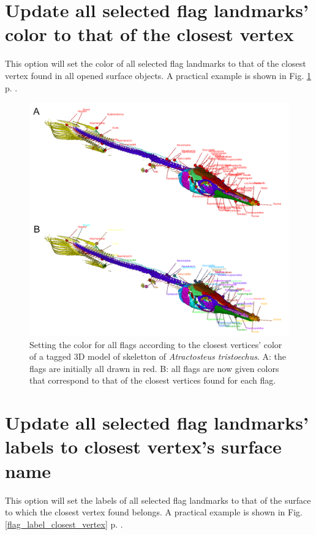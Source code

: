 \section{Update all selected flag landmarks' color to that of the closest vertex}

This option will set the color of all selected flag landmarks to that of the closest vertex found in all opened surface objects. A practical example is shown in Fig. \ref{flag_color_closest_vertex} p. \pageref{flag_color_closest_vertex}.

\begin{figure}
  \centering
  \includegraphics[scale=0.31]{images/10/edit_flag_color_closest_vertex.png} 
	\caption{Setting the color for all flags according to the closest vertices' color of a tagged 3D model of skeletton of \textit{Atractosteus tristoechus}. A: the flags are initially all  drawn in red. B: all flags are now given colors that correspond to that of the closest vertices found for each flag.}
\label{flag_color_closest_vertex}
\end{figure}


\section{Update all selected flag landmarks' labels to closest vertex's surface name}

This option will set the labels of all selected flag landmarks to that of the surface to which the closest vertex found belongs. A practical example is shown in Fig. \ref{flag_label_closest_vertex} p. \pageref{flag_color_closest_vertex}.

